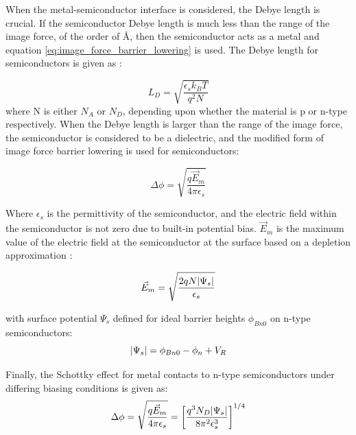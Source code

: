 \begin{refsection}
When the metal-semiconductor interface is considered, the Debye length is crucial. If the semiconductor Debye length is much less than the range of the image force, of the order of \si{\angstrom}, then the semiconductor acts as a metal and equation \ref{eq:image_force_barrier_lowering} is used. The Debye length for semiconductors is given as \cite{sze2006}:

\begin{equation}
\label{eq:debye_length}
    L_{D}= \sqrt{\frac{\epsilon_{s}k_{B}T}{q^{2}N}}
\end{equation}
where N is either $N_{A}$ or $N_{D}$, depending upon whether the material is p or n-type respectively. When the Debye length is larger than the range of the image force, the semiconductor is considered to be a dielectric, and the modified form of image force barrier lowering is used for semiconductors:

\begin{equation}
    \label{eq:image_force_barrier_lowering_semiconductor}
    \Delta\phi = \sqrt{\frac{q\vec{E}_{m}}{4\pi\epsilon_{s}}}
\end{equation}

Where $\epsilon_{s}$ is the permittivity of the semiconductor, and the electric field within the semiconductor is not zero due to built-in potential bias. $\Vec{E}_{m}$ is the maximum value of the electric field at the semiconductor at the surface based on a depletion approximation \cite{sze2006}:

\begin{equation}
    \label{eq:max_e_field_depletion_approx}
    \vec{E}_{m} = \sqrt{\frac{2qN\abs{\Psi_{s}}}{\epsilon_{s}}}
\end{equation}

with surface potential $\Psi_{s}$ defined for ideal barrier heights $\phi_{Bn0}$ on n-type semiconductors:
\begin{equation}
    \label{eq:surface_potential}
    \abs{\Psi_{s}}= \phi_{Bn0}-\phi_{n}+V_{R}
\end{equation}

Finally, the Schottky effect for metal contacts to n-type semiconductors under differing biasing conditions is given as:
\begin{equation}
    \label{eq:schottky_effect_or_image_force_barrier_lowering_n-type_semi}
    \Delta\phi = \sqrt{\frac{q\vec{E}_{m}}{4\pi\epsilon_{s}}} = \left[ \frac{q^{3}N_{D}\abs{\Psi_{s}}}{8\pi^{2}\epsilon_{s}^{3}} \right]^{1/4}
\end{equation}


\end{refsection}
